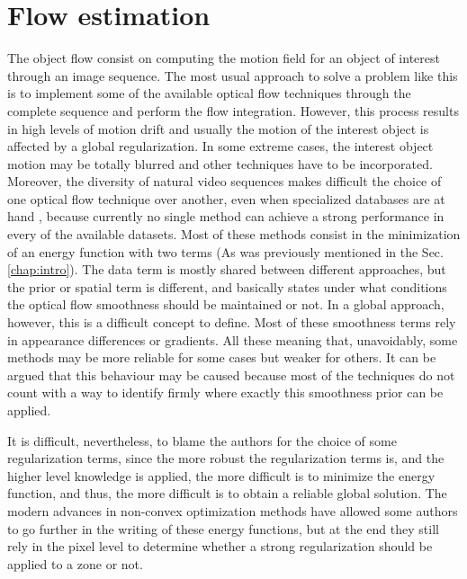 \section{Flow estimation}
\label{sec:core}

The object flow consist on computing the motion field for an object of interest through an image
sequence. The most usual approach to solve a problem like this is to implement some of the available
optical flow techniques through the complete sequence and perform the flow integration. 
However, this process results in high levels of motion drift \cite{c18}\cite{c19} and usually the motion of the interest
object is affected by a global regularization. In some extreme cases, the interest object motion
may be totally blurred and other techniques have to be incorporated. Moreover, the diversity
of natural video sequences makes difficult the choice of one optical flow technique over another, even when specialized
databases are at hand \cite{c17}, because currently no single method can achieve a strong 
performance in every of the available datasets. Most of these methods consist in the minimization 
of an energy function with two terms (As was previously mentioned in the Sec. \ref{chap:intro}). The data
term is mostly shared between different approaches, but the prior or spatial term is different, and basically states 
under what conditions the optical flow smoothness should be maintained or not. In a global approach, however,
this is a difficult concept to define. Most of these smoothness terms rely in appearance differences or gradients.
All these meaning that, unavoidably, some methods may be more reliable for some cases but weaker for others. 
It can be argued that this behaviour may be caused because most of the techniques do not count with a way to identify 
firmly where exactly this smoothness prior can be applied. 

It is difficult, nevertheless, to blame the authors for the choice of some regularization 
terms, since the more robust the regularization terms is, and the higher level knowledge is applied, the more difficult is to minimize the 
energy function, and thus, the more difficult is to obtain a reliable global solution. 
The modern advances in non-convex optimization methods have allowed some authors 
to go further in the writing of these energy functions, but at the end they still rely in the pixel level to determine whether a strong regularization 
should be applied to a zone or not.


